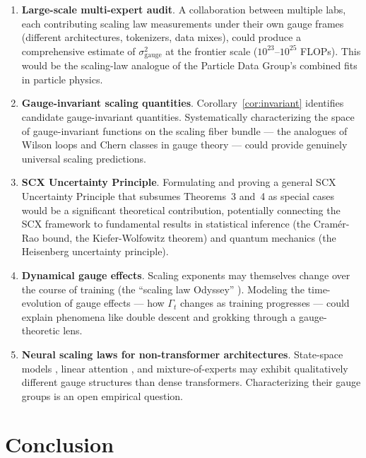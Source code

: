 \documentclass[12pt,a4paper]{article}
\theoremstyle{remark}
\begin{document}
\begin{enumerate}[label=F\arabic*:, leftmargin=*]
    \item \textbf{Large-scale multi-expert audit}. A collaboration between multiple labs, each contributing scaling law measurements under their own gauge frames (different architectures, tokenizers, data mixes), could produce a comprehensive estimate of $\sigma^2_{\text{gauge}}$ at the frontier scale ($10^{23}$--$10^{25}$ FLOPs). This would be the scaling-law analogue of the Particle Data Group's combined fits in particle physics.
    \item \textbf{Gauge-invariant scaling quantities}. Corollary~\ref{cor:invariant} identifies candidate gauge-invariant quantities. Systematically characterizing the space of gauge-invariant functions on the scaling fiber bundle — the analogues of Wilson loops and Chern classes in gauge theory — could provide genuinely universal scaling predictions.
    \item \textbf{SCX Uncertainty Principle}. Formulating and proving a general SCX Uncertainty Principle that subsumes Theorems~3 and~4 as special cases would be a significant theoretical contribution, potentially connecting the SCX framework to fundamental results in statistical inference (the Cram\'er-Rao bound, the Kiefer-Wolfowitz theorem) and quantum mechanics (the Heisenberg uncertainty principle).
    \item \textbf{Dynamical gauge effects}. Scaling exponents may themselves change over the course of training (the ``scaling law Odyssey'' \cite{besiroglu2024chinchilla}). Modeling the time-evolution of gauge effects — how $\Gamma_t$ changes as training progresses — could explain phenomena like double descent \cite{nakkiran2021deep} and grokking \cite{power2022grokking} through a gauge-theoretic lens.
    \item \textbf{Neural scaling laws for non-transformer architectures}. State-space models \cite{gu2022efficiently}, linear attention \cite{katharopoulos2020transformers}, and mixture-of-experts \cite{shazeer2017outrageously} may exhibit qualitatively different gauge structures than dense transformers. Characterizing their gauge groups is an open empirical question.
\end{enumerate}

\section{Conclusion}
\label{sec:conclusion}
\end{document}
